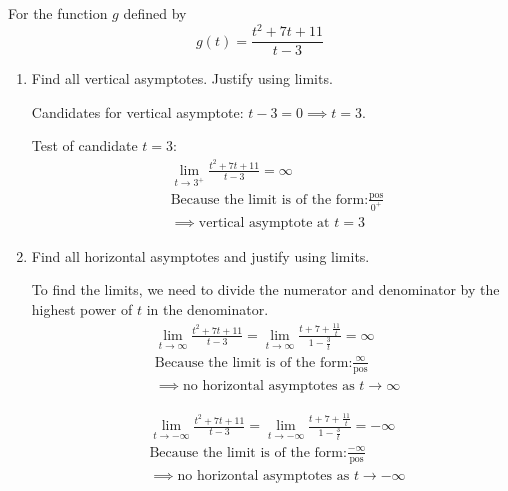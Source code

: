 \documentclass[nooutcomes]{ximera}
\begin{document}
\begin{problem}

  For the function $g$ defined by 
  \[
    g(t) = \frac{t^2 + 7t + 11}{t-3}
  \]
  \begin{enumerate}
    \item
      Find all vertical asymptotes.  Justify using limits.
      \begin{freeResponse}
        Candidates for vertical asymptote: $t - 3 = 0 \implies t = 3$.

        Test of candidate $t = 3$:
        \begin{align*}
          &\lim_{t \to 3^+} \frac{t^2 + 7t + 11}{t-3}= \infty \\
	&\text{Because the limit is of the form:} \frac{\text{pos}}{0^+}\\
          &\implies \mbox{vertical asymptote at $t = 3$}
        \end{align*}


      \end{freeResponse}


    \item

      Find all horizontal asymptotes and justify using limits.
      \begin{freeResponse}
	To find the limits, we need to divide the numerator and denominator by the highest power of $t$ in the denominator.
        \begin{align*} 
         &\lim_{t \to \infty} \frac{t^2 + 7t + 11}{t-3} = \lim_{t \to \infty} \frac{t + 7 + \frac{11}{t}}{1-\frac{3}{t}} = \infty \\
	&\text{Because the limit is of the form:} \frac{\infty}{\text{pos}}\\
          &\implies \mbox{no horizontal asymptotes as $t \to \infty$}
        \end{align*}

        \begin{align*}
         & \lim_{t \to -\infty} \frac{t^2 + 7t + 11}{t-3} = \lim_{t \to -\infty}\frac{t + 7 + \frac{11}{t}}{1-\frac{3}{t}} = -\infty \\
	&\text{Because the limit is of the form:} \frac{-\infty}{\text{pos}}\\
          &\implies \mbox{no horizontal asymptotes as $t \to -\infty$}
        \end{align*}
      \end{freeResponse}



  \end{enumerate}
\end{problem}
\end{document}
